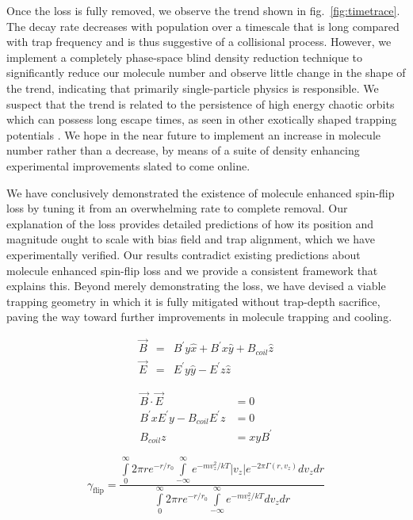 \documentclass[%
 reprint,
 amsmath,amssymb,
 aps,
prl,
]{revtex4-1}
\begin{document}
Once the loss is fully removed, we observe the trend shown in fig.~\ref{fig:timetrace}. The decay rate decreases with population over a timescale that is long compared with trap frequency and is thus suggestive of a collisional process. However, we implement a completely phase-space blind density reduction technique to significantly reduce our molecule number and observe little change in the shape of the trend, indicating that primarily single-particle physics is responsible. We suspect that the trend is related to the persistence of high energy chaotic orbits which can possess long escape times, as seen in other exotically shaped trapping potentials \cite{Gonzalez-Ferez2014}. We hope in the near future to implement an increase in molecule number rather than a decrease, by means of a suite of density enhancing experimental improvements slated to come online.

We have conclusively demonstrated the existence of molecule enhanced spin-flip loss by tuning it from an overwhelming rate to complete removal. Our explanation of the loss provides detailed predictions of how its position and magnitude ought to scale with bias field and trap alignment, which we have experimentally verified. Our results contradict existing predictions about molecule enhanced spin-flip loss and we provide a consistent framework that explains this. Beyond merely demonstrating the loss, we have devised a viable trapping geometry in which it is fully mitigated without trap-depth sacrifice, paving the way toward further improvements in molecule trapping and cooling.

\begin{eqnarray}
\vec{B} &=&  B^\prime y\hat{x}+ B^\prime x\hat{y} + B_{coil} \hat{z}\\
\vec{E} &=&  E^\prime y\hat{y}-  E^\prime z\hat{z}
\end{eqnarray}

\begin{eqnarray}
\vec{B}\cdot \vec{E} &= 0\\
B^\prime x E^\prime y - B_{coil}  E^\prime z &= 0\\
B_{coil}z &= xyB^\prime
\end{eqnarray}

\begin{equation}
\gamma_\text{flip}=\frac{\int\limits^\infty_0 2\pi r e^{-r/r_0} \int\limits^\infty_{-\infty} e^{-mv_z^2/kT} |v_z| e^{-2\pi\Gamma(r,v_z)}dv_zdr}{\int\limits^\infty_0 2\pi r e^{-r/r_0} \int\limits^\infty_{-\infty} e^{-mv_z^2/kT} dv_zdr}
\end{equation}

\nocite{*}

\end{document}
